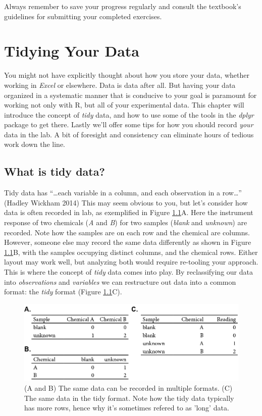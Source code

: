 \documentclass[
]{book}
\begin{document}
Always remember to save your progress regularly and consult the textbook's guidelines for submitting your completed exercises.

\hypertarget{tidying-your-data}{%
\chapter{Tidying Your Data}\label{tidying-your-data}}

You might not have explicitly thought about how you store your data, whether working in \emph{Excel} or elsewhere. Data is data after all. But having your data organized in a systematic manner that is conducive to your goal is paramount for working not only with R, but all of your experimental data. This chapter will introduce the concept of \emph{tidy} data, and how to use some of the tools in the \emph{dplyr} package to get there. Lastly we'll offer some tips for how you should record \emph{your} data in the lab. A bit of foresight and consistency can eliminate hours of tedious work down the line.

\hypertarget{what-is-tidy-data}{%
\section{What is tidy data?}\label{what-is-tidy-data}}

Tidy data has ``\ldots each variable in a column, and each observation in a row\ldots{}'' (Hadley Wickham 2014) This may seem obvious to you, but let's consider how data is often recorded in lab, as exemplified in Figure \ref{fig:tidy-example}A. Here the instrument response of two chemicals (\emph{A} and \emph{B}) for two samples (\emph{blank} and \emph{unknown}) are recorded. Note how the samples are on each row and the chemical are columns. However, someone else may record the same data differently as shown in Figure \ref{fig:tidy-example}B, with the samples occupying distinct columns, and the chemical rows. Either layout may work well, but analyzing both would require re-tooling your approach. This is where the concept of \emph{tidy} data comes into play. By reclassifying our data into \emph{observations} and \emph{variables} we can restructure out data into a common format: the \emph{tidy} format (Figure \ref{fig:tidy-example}C).

\begin{figure}
\includegraphics[width=12.99in]{images/tidy-example} \caption{(A and B) The same data can be recorded in multiple formats. (C) The same data in the tidy format. Note how the tidy data typically has more rows, hence why it's sometimes refered to as 'long' data.}\label{fig:tidy-example}
\end{figure}
\end{document}
